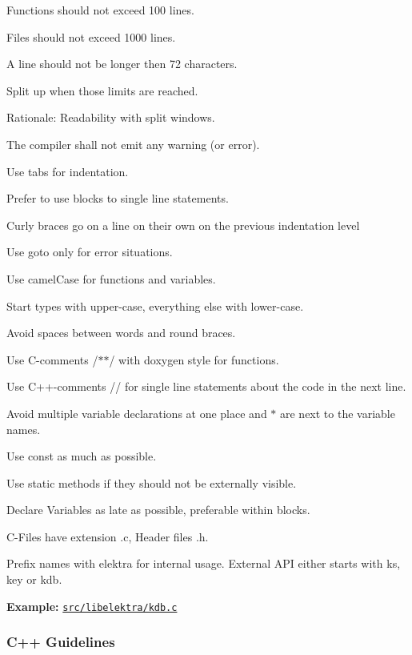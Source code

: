 \begin{DoxyItemize}
\item Functions should not exceed 100 lines.
\item Files should not exceed 1000 lines.
\item A line should not be longer then 72 characters.
\item Split up when those limits are reached.
\item Rationale\+: Readability with split windows.
\item The compiler shall not emit any warning (or error).
\item Use tabs for indentation.
\item Prefer to use blocks to single line statements.
\item Curly braces go on a line on their own on the previous indentation level
\item Use goto only for error situations.
\item Use camel\+Case for functions and variables.
\item Start types with upper-\/case, everything else with lower-\/case.
\item Avoid spaces between words and round braces.
\item Use C-\/comments {\ttfamily /$\ast$$\ast$/} with doxygen style for functions.
\item Use C++-\/comments {\ttfamily //} for single line statements about the code in the next line.
\item Avoid multiple variable declarations at one place and {\ttfamily $\ast$} are next to the variable names.
\item Use {\ttfamily const} as much as possible.
\item Use {\ttfamily static} methods if they should not be externally visible.
\item Declare Variables as late as possible, preferable within blocks.
\item C-\/\+Files have extension {\ttfamily .c}, Header files {\ttfamily .h}.
\item Prefix names with {\ttfamily elektra} for internal usage. External A\+P\+I either starts with {\ttfamily ks}, {\ttfamily key} or {\ttfamily kdb}.
\end{DoxyItemize}

{\bfseries Example\+:} \href{../src/libelektra/kdb.c}{\tt src/libelektra/kdb.\+c}

\subsubsection*{C++ Guidelines}



